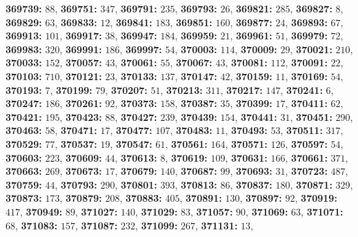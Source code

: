 \textsf{\bfseries 369739:} $88$, \textsf{\bfseries 369751:} $347$, \textsf{\bfseries 369791:} $235$, \textsf{\bfseries 369793:} $26$, \textsf{\bfseries 369821:} $285$, \textsf{\bfseries 369827:} $8$, \textsf{\bfseries 369829:} $63$, \textsf{\bfseries 369833:} $12$, \textsf{\bfseries 369841:} $183$, \textsf{\bfseries 369851:} $160$, \textsf{\bfseries 369877:} $24$, \textsf{\bfseries 369893:} $67$, \textsf{\bfseries 369913:} $101$, \textsf{\bfseries 369917:} $38$, \textsf{\bfseries 369947:} $184$, \textsf{\bfseries 369959:} $21$, \textsf{\bfseries 369961:} $51$, \textsf{\bfseries 369979:} $72$, \textsf{\bfseries 369983:} $320$, \textsf{\bfseries 369991:} $186$, \textsf{\bfseries 369997:} $54$, \textsf{\bfseries 370003:} $114$, \textsf{\bfseries 370009:} $29$, \textsf{\bfseries 370021:} $210$, \textsf{\bfseries 370033:} $152$, \textsf{\bfseries 370057:} $43$, \textsf{\bfseries 370061:} $55$, \textsf{\bfseries 370067:} $43$, \textsf{\bfseries 370081:} $112$, \textsf{\bfseries 370091:} $22$, \textsf{\bfseries 370103:} $710$, \textsf{\bfseries 370121:} $23$, \textsf{\bfseries 370133:} $137$, \textsf{\bfseries 370147:} $42$, \textsf{\bfseries 370159:} $11$, \textsf{\bfseries 370169:} $54$, \textsf{\bfseries 370193:} $7$, \textsf{\bfseries 370199:} $79$, \textsf{\bfseries 370207:} $51$, \textsf{\bfseries 370213:} $311$, \textsf{\bfseries 370217:} $147$, \textsf{\bfseries 370241:} $6$, \textsf{\bfseries 370247:} $186$, \textsf{\bfseries 370261:} $92$, \textsf{\bfseries 370373:} $158$, \textsf{\bfseries 370387:} $35$, \textsf{\bfseries 370399:} $17$, \textsf{\bfseries 370411:} $62$, \textsf{\bfseries 370421:} $195$, \textsf{\bfseries 370423:} $88$, \textsf{\bfseries 370427:} $239$, \textsf{\bfseries 370439:} $154$, \textsf{\bfseries 370441:} $31$, \textsf{\bfseries 370451:} $290$, \textsf{\bfseries 370463:} $58$, \textsf{\bfseries 370471:} $17$, \textsf{\bfseries 370477:} $107$, \textsf{\bfseries 370483:} $11$, \textsf{\bfseries 370493:} $53$, \textsf{\bfseries 370511:} $317$, \textsf{\bfseries 370529:} $77$, \textsf{\bfseries 370537:} $19$, \textsf{\bfseries 370547:} $61$, \textsf{\bfseries 370561:} $164$, \textsf{\bfseries 370571:} $126$, \textsf{\bfseries 370597:} $54$, \textsf{\bfseries 370603:} $223$, \textsf{\bfseries 370609:} $44$, \textsf{\bfseries 370613:} $8$, \textsf{\bfseries 370619:} $109$, \textsf{\bfseries 370631:} $166$, \textsf{\bfseries 370661:} $371$, \textsf{\bfseries 370663:} $269$, \textsf{\bfseries 370673:} $17$, \textsf{\bfseries 370679:} $140$, \textsf{\bfseries 370687:} $99$, \textsf{\bfseries 370693:} $31$, \textsf{\bfseries 370723:} $487$, \textsf{\bfseries 370759:} $44$, \textsf{\bfseries 370793:} $290$, \textsf{\bfseries 370801:} $393$, \textsf{\bfseries 370813:} $86$, \textsf{\bfseries 370837:} $180$, \textsf{\bfseries 370871:} $329$, \textsf{\bfseries 370873:} $173$, \textsf{\bfseries 370879:} $208$, \textsf{\bfseries 370883:} $405$, \textsf{\bfseries 370891:} $130$, \textsf{\bfseries 370897:} $92$, \textsf{\bfseries 370919:} $417$, \textsf{\bfseries 370949:} $89$, \textsf{\bfseries 371027:} $140$, \textsf{\bfseries 371029:} $83$, \textsf{\bfseries 371057:} $90$, \textsf{\bfseries 371069:} $63$, \textsf{\bfseries 371071:} $68$, \textsf{\bfseries 371083:} $157$, \textsf{\bfseries 371087:} $232$, \textsf{\bfseries 371099:} $267$, \textsf{\bfseries 371131:} $13$, 
